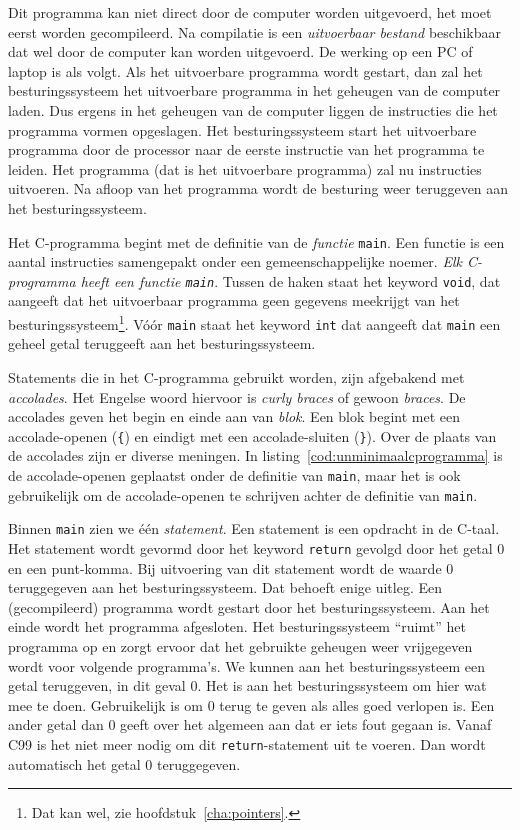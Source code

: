 Dit programma kan niet direct door de computer worden uitgevoerd, het moet eerst worden gecompileerd. Na compilatie is een \textsl{uitvoerbaar bestand} beschikbaar dat wel door de computer kan worden uitgevoerd. De werking op een PC of laptop is als volgt. Als het uitvoerbare programma wordt gestart, dan zal het besturingssysteem het uitvoerbare programma in het geheugen van de computer laden. Dus ergens in het geheugen van de computer liggen de instructies die het programma vormen opgeslagen. Het besturingssysteem start het uitvoerbare programma door de processor naar de eerste instructie van het programma te leiden. Het programma (dat is het uitvoerbare programma) zal nu instructies uitvoeren. Na afloop van het programma wordt de besturing weer teruggeven aan het besturingssysteem.

Het C-programma begint met de definitie van de \textsl{functie} \texttt{main}. Een functie is een aantal instructies samengepakt onder een gemeenschappelijke noemer. \textsl{Elk C-programma heeft een functie \texttt{main}}. Tussen de haken staat het keyword \texttt{void}, dat aangeeft dat het uitvoerbaar programma geen gegevens meekrijgt van het besturingssysteem\footnote{Dat kan wel, zie hoofdstuk~\ref{cha:pointers}.}. Vóór \texttt{main} staat het keyword \texttt{int} dat aangeeft dat \texttt{main} een geheel getal teruggeeft aan het besturingssysteem.
 
Statements die in het C-programma gebruikt worden, zijn afgebakend met \textsl{accolades}. Het Engelse woord hiervoor is \textsl{curly braces} of gewoon \textsl{braces}. De accolades geven het begin en einde aan van \textsl{blok}. Een blok begint met een accolade-openen (\texttt{\{}) en eindigt met een accolade-sluiten (\texttt{\}}). Over de plaats van de accolades zijn er diverse meningen. In listing~\ref{cod:unminimaalcprogramma} is de accolade-openen geplaatst onder de definitie van \texttt{main}, maar het is ook gebruikelijk om de accolade-openen te schrijven achter de definitie van \texttt{main}.
 
Binnen \texttt{main} zien we één \textsl{statement}. Een statement is een opdracht in de C-taal. Het statement wordt gevormd door het keyword \texttt{return} gevolgd door het getal 0 en een punt-komma. Bij uitvoering van dit statement wordt de waarde 0 teruggegeven aan het besturingssysteem. Dat behoeft enige uitleg. Een (gecompileerd) programma wordt gestart door het besturingssysteem. Aan het einde wordt het programma afgesloten. Het besturingssysteem ``ruimt'' het programma op en zorgt ervoor dat het gebruikte geheugen weer vrijgegeven wordt voor volgende programma's. We kunnen aan het besturingssysteem een getal teruggeven, in dit geval 0. Het is aan het besturingssysteem om hier wat mee te doen. Gebruikelijk is om 0 terug te geven als alles goed verlopen is. Een ander getal dan 0 geeft over het algemeen aan dat er iets fout gegaan is. Vanaf C99 is het niet meer nodig om dit \texttt{return}-statement uit te voeren. Dan wordt automatisch het getal 0 teruggegeven.

